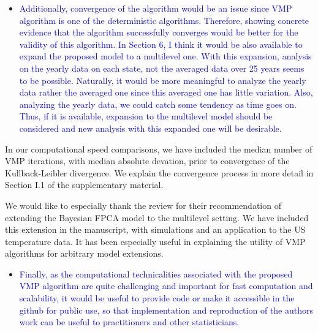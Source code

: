 \documentclass[12pt]{article}
\theoremstyle{plain}
\theoremstyle{definition}
\theoremstyle{remark}
\begin{document}
\vspace{2\baselineskip}

\begin{itemize}
	\item[\textcolor{blue}{\textbullet}] \textcolor{blue}{
		Additionally, convergence of the algorithm would be an issue since VMP algorithm is one of the deterministic algorithms.
		Therefore, showing concrete evidence that the algorithm successfully converges would be better for the validity of this
		algorithm. In Section 6, I think it would be also available to expand the proposed model to a multilevel one. With this expansion,
		analysis on the yearly data on each state, not the averaged data over 25 years seems to be possible. Naturally, it would be
		more meaningful to analyze the yearly data rather the averaged one since this averaged one has little variation. Also, analyzing
		the yearly data, we could catch some tendency as time goes on. Thus, if it is available, expansion to the multilevel model
		should be considered and new analysis with this expanded one will be desirable.
	}
\end{itemize}

\vspace{1\baselineskip}

In our computational speed comparisons, we have included the median number of VMP iterations, with median absolute devation,
prior to convergence of the Kullback-Leibler divergence. We explain the convergence process in more detail in Section I.1 of the
supplementary material.

\vspace{1\baselineskip}

We would like to especially thank the review for their recommendation of extending the Bayesian FPCA model to the multilevel
setting. We have included this extension in the manuscript, with simulations and an application to the US temperature data.
It has been especially useful in explaining the utility of VMP algorithms for arbitrary model extensions.

\vspace{2\baselineskip}

\begin{itemize}
	\item[\textcolor{blue}{\textbullet}] \textcolor{blue}{
		Finally, as the computational technicalities associated with the proposed VMP algorithm are quite challenging and
		important for fast computation and scalability, it would be useful to provide code or make it accessible in the github
		for public use, so that implementation and reproduction of the authors work can be useful to practitioners and other
		statisticians.
	}
\end{itemize}
\end{document}
